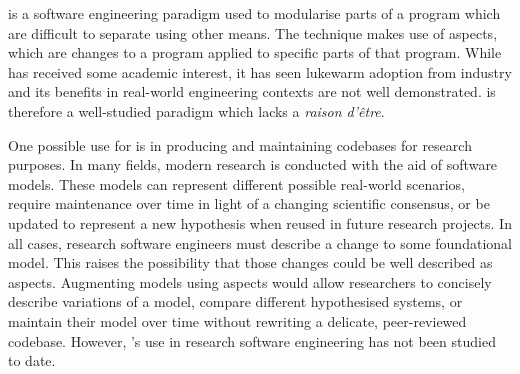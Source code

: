 
    \Aop{} is a software engineering paradigm used to modularise parts of a
    program which are difficult to separate using other means. The technique
    makes use of aspects, which are changes to a program applied to specific
    parts of that program. While \aop{} has received some academic interest, it
    has seen lukewarm adoption from industry and its benefits in real-world
    engineering contexts are not well demonstrated. \Aop{} is therefore a
    well-studied paradigm which lacks a \emph{raison d'\^etre}.
    
    One possible use for \aop{} is in producing and maintaining codebases for
    research purposes. In many fields, modern research is conducted with the aid
    of software models. These models can represent different possible real-world
    scenarios, require maintenance over time in light of a changing scientific
    consensus, or be updated to represent a new hypothesis when reused in future
    research projects. In all cases, research software engineers must describe a
    change to some foundational model. This raises the possibility that those
    changes could be well described as aspects. Augmenting models using aspects
    would allow researchers to concisely describe variations of a model, compare
    different hypothesised systems, or maintain their model over time without
    rewriting a delicate, peer-reviewed codebase. However, \aop{}'s use in
    research software engineering has not been studied to date.





